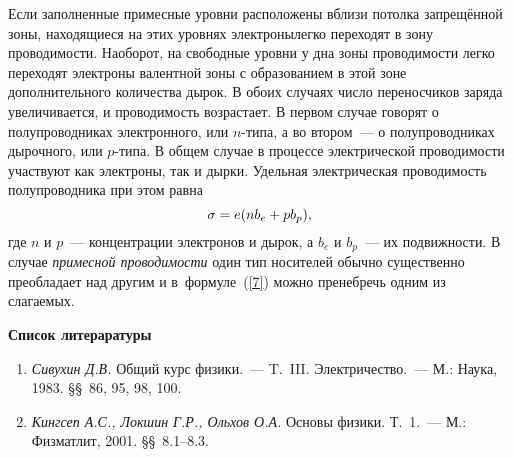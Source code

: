 Если заполненные примесные уровни расположены вблизи потолка запрещённой зоны, находящиеся на этих уровнях электронылегко переходят в зону проводимости. Наоборот, на свободные уровни у дна зоны проводимости легко переходят электроны валентной зоны с образованием в этой зоне дополнительного количества дырок. В обоих случаях число переносчиков заряда увеличивается, и проводимость возрастает. В первом случае говорят о полупроводниках {электронного}, или $n$-типа, а во втором~--- о  полупроводниках дырочного, или $p$-типа. В общем случае в процессе электрической проводимости участвуют как электроны, так и дырки. Удельная электрическая проводимость полупроводника при этом равна
\begin{equation}
	\eqmark{7}
\sigma=e(nb_e+pb_p),
\end{equation}
где $n$ и $p$~--- концентрации электронов и дырок, а $b_e$ и $b_p$~--- их подвижности. В случае \textit{примесной
проводимости} один тип носителей обычно существенно преобладает над другим и в~формуле~(\eqref{7}) можно пренебречь одним из слагаемых.


{\small


{\bf \Large Список литераратуры}

\begin{enumerate}
\item{ \emph{Сивухин Д.В.} Общий курс физики.~--- T.~III. Электричество.~--- М.: Наука, 1983. \S\S~86, 95, 98, 100.}
\item{ \emph{Кингсеп А.С., Локшин Г.Р., Ольхов О.А.} Основы физики. Т.~1.~--- М.: Физматлит, 2001. \S\S~8.1--8.3.}
\end{enumerate}

}

